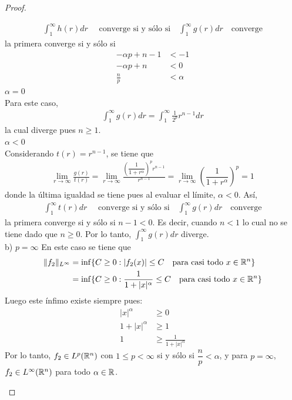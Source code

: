 \begin{proof}
\begin{enumerate}
 \begin{align*}
     \int_1^{\infty}h(r)dr \quad \text{ converge si y sólo si} \quad \int_1^{\infty}g(r)dr \quad \text{converge}
 \end{align*}
 la primera converge si y sólo si
 \begin{align*}
      -\alpha p+n-1&<-1 \\
    -\alpha p +n&<0 \\
    \frac{n}{p}&<\alpha
 \end{align*}
\checkmark $\alpha=0$ \\
Para este caso, 
\begin{align*}
    \int_1^{\infty}g(r)dr=\int_1^{\infty}\frac{1}{2^p}r^{n-1}dr
\end{align*}
la cual diverge pues $n\geq 1$. \\
\checkmark $\alpha<0$ \\
Considerando $t(r)=r^{n-1}$, se tiene que
\begin{align*}
     \lim_{r\to\infty}\frac{g(r)}{t(r)}=\lim_{r\to\infty}\frac{\left(\dfrac{1}{1+r^\alpha}\right)^pr^{n-1}}{r^{n-1}}=\lim_{r\to\infty}\left(\dfrac{1}{1+r^\alpha}\right)^p=1
 \end{align*}
 donde la última igualdad se tiene pues al evaluar el límite, $\alpha<0$. Así, 
 \begin{align*}
     \int_1^{\infty}t(r)dr \quad \text{ converge si y sólo si} \quad \int_1^{\infty}g(r)dr \quad \text{converge}
 \end{align*}
 la primera converge si y sólo si $n-1<0$. Es decir, cuando $n<1$ lo cual no se tiene dado que $n\geq 0$. Por lo tanto, $\displaystyle\int_1^{\infty}g(r)dr$ diverge. \\
 b) $p=\infty$
 En este caso se tiene que
\begin{align*}
\|f_2\|_{L^\infty} &= \inf \{ C \geq 0 : |f_2(x)| \leq C \quad \text{para casi todo } x \in \mathbb{R}^{n}\} \\
&=\inf\{C\geq0: \dfrac{1}{1+|x|^\alpha}\leq C \quad \text{para casi todo $x \in \mathbb{R}^n$}\}
\end{align*}
Luego este ínfimo existe siempre pues:
\begin{align*}
    |x|^{\alpha}&\geq 0 \\
    1+|x|^{\alpha} &\geq 1 \\
    1 &\geq\frac{1}{1+|x|^{\alpha}}
\end{align*}
Por lo tanto, $f_2 \in L^{p}(\mathbb{R}^n)$ con $1\leq p < \infty$ si y sólo si $\dfrac{n}{p}<\alpha$, y para $p=\infty$, $f_2\in L^{\infty}(\mathbb{R}^n)$ para todo $\alpha \in \mathbb{R}$.
\end{enumerate}
\end{proof}


